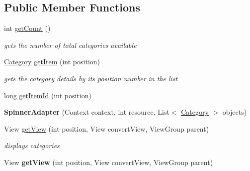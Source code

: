 \subsection*{Public Member Functions}
\begin{DoxyCompactItemize}
\item 
int \hyperlink{classcom_1_1example_1_1sel_1_1lostfound_1_1SpinnerAdapter_abc64eee361c0d66d3cdc348411151a78}{get\+Count} ()\hypertarget{classcom_1_1example_1_1sel_1_1lostfound_1_1SpinnerAdapter_abc64eee361c0d66d3cdc348411151a78}{}\label{classcom_1_1example_1_1sel_1_1lostfound_1_1SpinnerAdapter_abc64eee361c0d66d3cdc348411151a78}

\begin{DoxyCompactList}\small\item\em gets the number of total categories available \end{DoxyCompactList}\item 
\hyperlink{classcom_1_1example_1_1sel_1_1lostfound_1_1Category}{Category} \hyperlink{classcom_1_1example_1_1sel_1_1lostfound_1_1SpinnerAdapter_a5bc75d45e6f9ddba257c56de5c5eab2f}{get\+Item} (int position)
\begin{DoxyCompactList}\small\item\em gets the category details by its position number in the list \end{DoxyCompactList}\item 
long \hyperlink{classcom_1_1example_1_1sel_1_1lostfound_1_1SpinnerAdapter_add68ca756de44422cbb3a19abea67c28}{get\+Item\+Id} (int position)\hypertarget{classcom_1_1example_1_1sel_1_1lostfound_1_1SpinnerAdapter_add68ca756de44422cbb3a19abea67c28}{}\label{classcom_1_1example_1_1sel_1_1lostfound_1_1SpinnerAdapter_add68ca756de44422cbb3a19abea67c28}

\begin{DoxyCompactList}\small\item\em 

 \end{DoxyCompactList}\item 
{\bfseries Spinner\+Adapter} (Context context, int resource, List$<$ \hyperlink{classcom_1_1example_1_1sel_1_1lostfound_1_1Category}{Category} $>$ objects)\hypertarget{classcom_1_1example_1_1sel_1_1lostfound_1_1SpinnerAdapter_a4cd34e4d92f9418efc1d68c3a99a2e96}{}\label{classcom_1_1example_1_1sel_1_1lostfound_1_1SpinnerAdapter_a4cd34e4d92f9418efc1d68c3a99a2e96}

\item 
View \hyperlink{classcom_1_1example_1_1sel_1_1lostfound_1_1SpinnerAdapter_a917db55750e96e48557ed897424f7b8d}{get\+View} (int position, View convert\+View, View\+Group parent)
\begin{DoxyCompactList}\small\item\em displays categories \end{DoxyCompactList}\item 
View {\bfseries get\+View} (int position, View convert\+View, View\+Group parent)\hypertarget{classcom_1_1example_1_1sel_1_1lostfound_1_1SpinnerAdapter_ac19132459aeaef196c367a156bb03e0e}{}\label{classcom_1_1example_1_1sel_1_1lostfound_1_1SpinnerAdapter_ac19132459aeaef196c367a156bb03e0e}


\end{DoxyCompactItemize}
